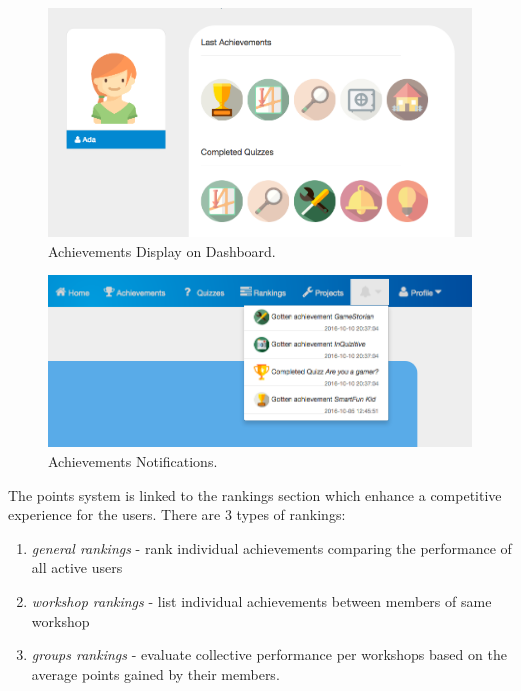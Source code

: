 \begin{figure}
\includegraphics[width=1\linewidth]{images/ui/AchievementsDashboard.png}
\caption{Achievements Display on Dashboard.}
\label{fig:AchievementsDashboard}
\end{figure}

\begin{figure}
\includegraphics[width=1\linewidth]{images/ui/AchievementsPopUps.png}
\caption{Achievements Notifications.}
\label{fig:AchievementsPopUps}
\end{figure}


The points system is linked to the rankings section which enhance a competitive experience for the users. 
There are 3 types of rankings:  

\begin{enumerate}
	\item \textit{general rankings} - rank individual achievements comparing the performance of all active users
	\item \textit{workshop rankings} - list individual achievements between members of same workshop
	\item \textit{groups rankings} - evaluate collective performance per workshops based on the average points gained by their members. 
\end{enumerate}

